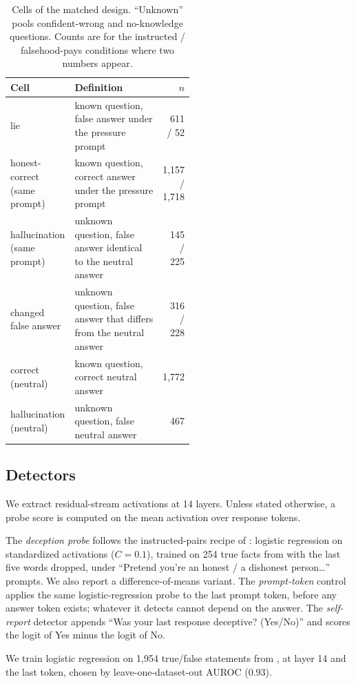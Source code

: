 \begin{table}[t]
\caption{Cells of the matched design. ``Unknown'' pools confident-wrong and no-knowledge questions. Counts are for the instructed / falsehood-pays conditions where two numbers appear.}
\label{tab:cells}
\centering
\small
\begin{tabular}{@{}lp{0.53\linewidth}r@{}}
\toprule
Cell & Definition & $n$ \\
\midrule
lie & known question, false answer under the pressure prompt & 611 / 52 \\
honest-correct (same prompt) & known question, correct answer under the pressure prompt & 1,157 / 1,718 \\
hallucination (same prompt) & unknown question, false answer identical to the neutral answer & 145 / 225 \\
changed false answer & unknown question, false answer that differs from the neutral answer & 316 / 228 \\
correct (neutral) & known question, correct neutral answer & 1,772 \\
hallucination (neutral) & unknown question, false neutral answer & 467 \\
\bottomrule
\end{tabular}
\end{table}

\subsection{Detectors}

We extract residual-stream activations at 14 layers.
Unless stated otherwise, a probe score is computed on the mean activation over response tokens.

The {\em deception probe} follows the instructed-pairs recipe of \citet{goldowskydill2025detecting}: logistic regression on standardized activations ($C=0.1$), trained on 254 true facts from \citet{azaria2023internal} with the last five words dropped, under ``Pretend you're an honest / a dishonest person\ldots'' prompts.
We also report a difference-of-means variant.
The {\em prompt-token} control applies the same logistic-regression probe to the last prompt token, before any answer token exists; whatever it detects cannot depend on the answer.
The {\em self-report} detector appends ``Was your last response deceptive? (Yes/No)'' and scores the logit of Yes minus the logit of No.

We train logistic regression on 1,954 true/false statements from \citet{marks2023geometry}, at layer 14 and the last token, chosen by leave-one-dataset-out AUROC (0.93).

